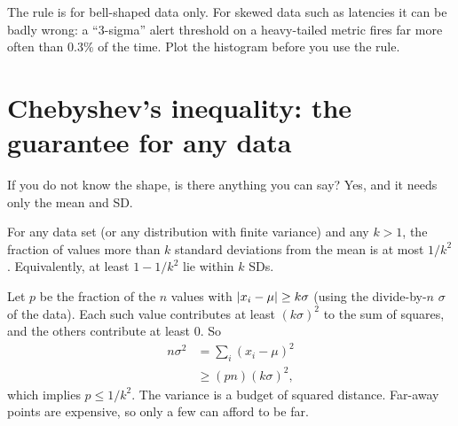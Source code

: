 \begin{trapbox}
The rule is for bell-shaped data only. For skewed data such as latencies it can be
badly wrong: a ``3-sigma'' alert threshold on a heavy-tailed metric fires far more
often than $0.3\%$ of the time. Plot the histogram before you use the rule.
\end{trapbox}

\section{Chebyshev's inequality: the guarantee for any data}
\label{sec:center-spread-chebyshev}

If you do not know the shape, is there anything you can say? Yes, and it needs only
the mean and SD.

\begin{theorem}
For any data set (or any distribution with finite variance) and any $k > 1$, the
fraction of values more than $k$ standard deviations from the mean is at most
$1/k^2$. Equivalently, at least $1 - 1/k^2$ lie within $k$ SDs.
\end{theorem}

\begin{whybox}
Let $p$ be the fraction of the $n$ values with $\lvert x_i - \mu\rvert \ge k\sigma$ (using
the divide-by-$n$ $\sigma$ of the data). Each such value contributes at least
$(k\sigma)^2$ to the sum of squares, and the others contribute at least $0$. So
\begin{align*}
  n\sigma^2 &= \sum_{i} (x_i - \mu)^2 \\
            &\ge (pn)(k\sigma)^2,
\end{align*}
which implies $p \le 1/k^2$.
The variance is a budget of squared distance. Far-away points are expensive, so
only a few can afford to be far.
\end{whybox}

